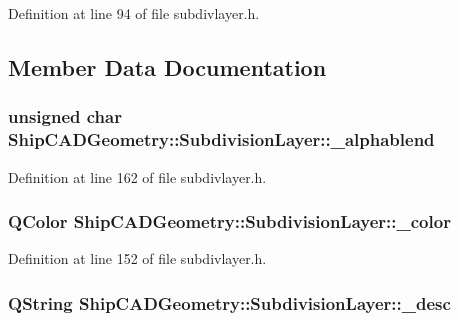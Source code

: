 Definition at line 94 of file subdivlayer.\-h.



\subsection{Member Data Documentation}
\hypertarget{classShipCADGeometry_1_1SubdivisionLayer_a9797f92ac85b0e981ce8c78bd104c112}{
\subsubsection[{\-\_\-alphablend}]{\setlength{\rightskip}{0pt plus 5cm}unsigned char Ship\-C\-A\-D\-Geometry\-::\-Subdivision\-Layer\-::\-\_\-alphablend\hspace{0.3cm}{\ttfamily [protected]}}}\label{classShipCADGeometry_1_1SubdivisionLayer_a9797f92ac85b0e981ce8c78bd104c112}


Definition at line 162 of file subdivlayer.\-h.

\hypertarget{classShipCADGeometry_1_1SubdivisionLayer_a761c7aba109a7b6804d38394afcecd43}{
\subsubsection[{\-\_\-color}]{\setlength{\rightskip}{0pt plus 5cm}Q\-Color Ship\-C\-A\-D\-Geometry\-::\-Subdivision\-Layer\-::\-\_\-color\hspace{0.3cm}{\ttfamily [protected]}}}\label{classShipCADGeometry_1_1SubdivisionLayer_a761c7aba109a7b6804d38394afcecd43}


Definition at line 152 of file subdivlayer.\-h.

\hypertarget{classShipCADGeometry_1_1SubdivisionLayer_a6a3e5be6a7582173e1d21c1b602fcdf3}{
\subsubsection[{\-\_\-desc}]{\setlength{\rightskip}{0pt plus 5cm}Q\-String Ship\-C\-A\-D\-Geometry\-::\-Subdivision\-Layer\-::\-\_\-desc\hspace{0.3cm}{\ttfamily [protected]}}}\label{classShipCADGeometry_1_1SubdivisionLayer_a6a3e5be6a7582173e1d21c1b602fcdf3}


